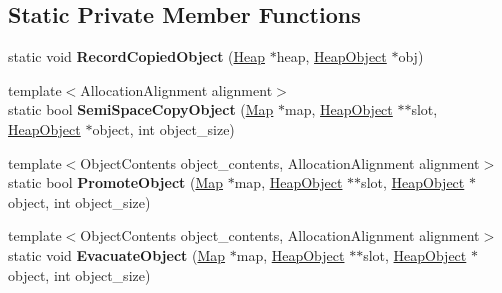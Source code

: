 \subsection*{Static Private Member Functions}
\begin{DoxyCompactItemize}
\item 
static void {\bfseries Record\+Copied\+Object} (\hyperlink{classv8_1_1internal_1_1_heap}{Heap} $\ast$heap, \hyperlink{classv8_1_1internal_1_1_heap_object}{Heap\+Object} $\ast$obj)\hypertarget{classv8_1_1internal_1_1_scavenging_visitor_a4ac129fe86bb6249a0ede8f2fd865d5d}{}\label{classv8_1_1internal_1_1_scavenging_visitor_a4ac129fe86bb6249a0ede8f2fd865d5d}

\item 
{\footnotesize template$<$Allocation\+Alignment alignment$>$ }\\static bool {\bfseries Semi\+Space\+Copy\+Object} (\hyperlink{classv8_1_1internal_1_1_map}{Map} $\ast$map, \hyperlink{classv8_1_1internal_1_1_heap_object}{Heap\+Object} $\ast$$\ast$slot, \hyperlink{classv8_1_1internal_1_1_heap_object}{Heap\+Object} $\ast$object, int object\+\_\+size)\hypertarget{classv8_1_1internal_1_1_scavenging_visitor_a9a75ef77df58f742e0109acdfb5375d4}{}\label{classv8_1_1internal_1_1_scavenging_visitor_a9a75ef77df58f742e0109acdfb5375d4}

\item 
{\footnotesize template$<$Object\+Contents object\+\_\+contents, Allocation\+Alignment alignment$>$ }\\static bool {\bfseries Promote\+Object} (\hyperlink{classv8_1_1internal_1_1_map}{Map} $\ast$map, \hyperlink{classv8_1_1internal_1_1_heap_object}{Heap\+Object} $\ast$$\ast$slot, \hyperlink{classv8_1_1internal_1_1_heap_object}{Heap\+Object} $\ast$object, int object\+\_\+size)\hypertarget{classv8_1_1internal_1_1_scavenging_visitor_a7fa64c8d63b4b74f9e6674f109c76eab}{}\label{classv8_1_1internal_1_1_scavenging_visitor_a7fa64c8d63b4b74f9e6674f109c76eab}

\item 
{\footnotesize template$<$Object\+Contents object\+\_\+contents, Allocation\+Alignment alignment$>$ }\\static void {\bfseries Evacuate\+Object} (\hyperlink{classv8_1_1internal_1_1_map}{Map} $\ast$map, \hyperlink{classv8_1_1internal_1_1_heap_object}{Heap\+Object} $\ast$$\ast$slot, \hyperlink{classv8_1_1internal_1_1_heap_object}{Heap\+Object} $\ast$object, int object\+\_\+size)\hypertarget{classv8_1_1internal_1_1_scavenging_visitor_a0aff70f247bfc5d908d9f4ef4ec904e4}{}\label{classv8_1_1internal_1_1_scavenging_visitor_a0aff70f247bfc5d908d9f4ef4ec904e4}


\end{DoxyCompactItemize}
